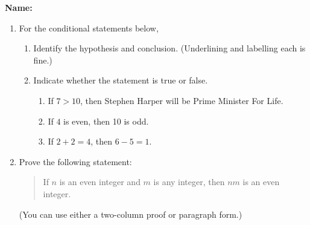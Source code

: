 \documentclass[12pt]{article}
\newcommand{\points}[1]{\marginpar{\hspace{24pt}[#1]}}
\begin{document}
{\bf Name:}
\thispagestyle{fancy}

 \begin{enumerate}
 \item  For the conditional statements below,
\begin{enumerate}
 \item Identify the hypothesis and conclusion. (Underlining and labelling each is fine.)
 \item Indicate whether the statement is true or false. 
\begin{enumerate}
 \item If $7>10$, then Stephen Harper will be Prime Minister For Life. \points{2}


 \item If $4$ is even, then 10 is odd. \points{2}

\vspace{2in}

 \item If $2+2=4$, then $6-5 = 1$. \points{2}
\end{enumerate}

\end{enumerate}
\newpage
\item Prove the following statement:
\begin{quotation}
 If $n$ is an even integer and $m$ is any integer, then $nm$ is an even integer.\points{4}
\end{quotation}
(You can use either a two-column proof or paragraph form.)
 \end{enumerate}
\end{document}
